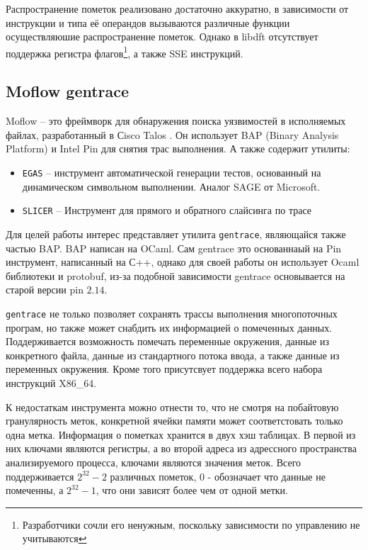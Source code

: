 Распространение пометок реализовано достаточно аккуратно, в зависимости от инструкции и типа её операндов вызываются различные функции осуществляюшие распространение пометок. Однако в libdft отсутствует поддержка регистра флагов\footnote{Разработчики сочли его ненужным, поскольку зависимости по управлению не учитываются}, а также SSE инструкций.

\subsection{Moflow gentrace}

Moflow -- это фреймворк для обнаружения поиска уязвимостей в исполняемых файлах, разработанный в Сisco Talos \cite{moflow}. Он использует BAP (Binary Analysis Platform) и Intel Pin для снятия трас выполнения.
А также содержит утилиты:
\begin{itemize}
    \item \texttt{EGAS} -- инструмент автоматической генерации тестов, основанный на динамическом символьном выполнении. Аналог SAGE от Microsoft.
    \item \texttt{SLICER} -- Инструмент для прямого и обратного слайсинга по трасе
\end{itemize}

Для целей работы интерес представляет утилита \texttt{gentrace}, являющайся также частью BAP. BAP написан на OCaml. Сам gentrace это основаннаый на Pin инструмент, написанный на С++, однако для своей работы он использует Ocaml библиотеки и protobuf, из-за подобной зависимости gentrace основывается на старой версии pin $2.14$.

\texttt{gentrace} не только позволяет сохранять трассы выполнения многопоточных програм, но также может снабдить их информацией о помеченных данных. Поддерживается возможность помечать переменные окружения, данные из конкретного файла, данные из стандартного потока ввода, а также данные из переменных окружения.
Кроме того присутсвует поддержка всего набора инструкций X86\_64.

К недостаткам инструмента можно отнести то, что не смотря на побайтовую гранулярность меток, конкретной ячейки памяти может соответстовать только одна метка. Информация о пометках хранится в двух хэш таблицах. В первой из них ключами являются регистры, а во второй адреса из адрессного пространства анализируемого процесса, ключами являются значения меток. Всего поддерживается $2^{32}-2$ различных пометок, $0$ - обозначает что данные не помеченны, а $2^{32} - 1$, что они зависят более чем от одной метки.

